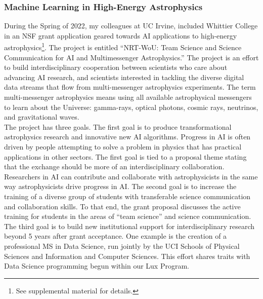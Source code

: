 \documentclass[../../../main.tex]{subfiles}
\begin{document}
\subsubsection{Machine Learning in High-Energy Astrophysics}

During the Spring of 2022, my colleagues at UC Irvine, included Whittier College in an NSF grant application geared towards AI applications to high-energy astrophysics\footnote{See supplemental material for details.}.  The project is entitled ``NRT-WoU: Team Science and Science Communication for AI and Multimessenger Astrophysics.''  The project is an effort to build interdisciplinary cooperation between scientists who care about advancing AI research, and scientists interested in tackling the diverse digital data streams that flow from multi-messenger astrophysics experiments.  The term multi-messenger astrophysics means using all available astrophysical messengers to learn about the Universe: gamma-rays, optical photons, cosmic rays, neutrinos, and gravitational waves.
\\
\vspace{0.15cm}
The project has three goals.  The first goal is to produce transformational astrophysics research and innovative new AI algorithms.  Progress in AI is often driven by people attempting to solve a problem in physics that has practical applications in other sectors.  The first goal is tied to a proposal theme stating that the exchange should be more of an interdisciplinary collaboration.  Researchers in AI can contribute and collaborate with astrophysicists in the same way astrophysicists drive progress in AI.  The second goal is to increase the training of a diverse group of students with transferable science communication and collaboration skills.  To that end, the grant proposal discusses the active training for students in the areas of ``team science'' and science communication.  The third goal is to build new institutional support for interdisciplinary research beyond 5 years after grant acceptance.  One example is the creation of a professional MS in Data Science, run jointly by the UCI Schools of Physical Sciences and Information and Computer Sciences.  This effort shares traits with Data Science programming begun within our Lux Program.
\\
\vspace{0.15cm}
\end{document}
